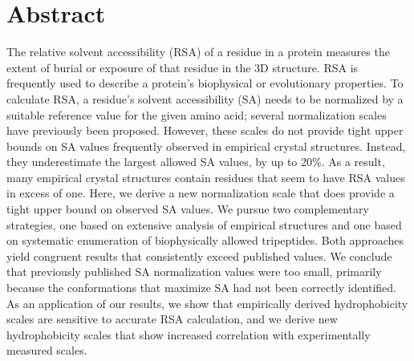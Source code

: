 \documentclass[11pt]{article}
\begin{document}
\section*{Abstract}
The relative solvent accessibility (RSA) of a residue in a protein measures the extent of burial or exposure of that residue in the 3D structure. RSA is frequently used to describe a protein's biophysical or evolutionary properties. To calculate RSA, a residue's solvent accessibility (SA) needs to be normalized by a suitable reference value for the given amino acid; several normalization scales have previously been proposed. However, these scales do not provide tight upper bounds on SA values frequently observed in empirical crystal structures. Instead, they underestimate the largest allowed SA values, by up to 20\%. As a result, many empirical crystal structures contain residues that seem to have RSA values in excess of one. Here, we derive a new normalization scale that does provide a tight upper bound on observed SA values. We pursue two complementary strategies, one based on extensive analysis of empirical structures and one based on systematic enumeration of biophysically allowed tripeptides. Both approaches yield congruent results that consistently exceed published values. We conclude that previously published SA normalization values were too small, primarily because the conformations that maximize SA had not been correctly identified. As an application of our results, we show that empirically derived hydrophobicity scales are sensitive to accurate RSA calculation, and we derive new hydrophobicity scales that show increased correlation with experimentally measured scales.

\end{document}
